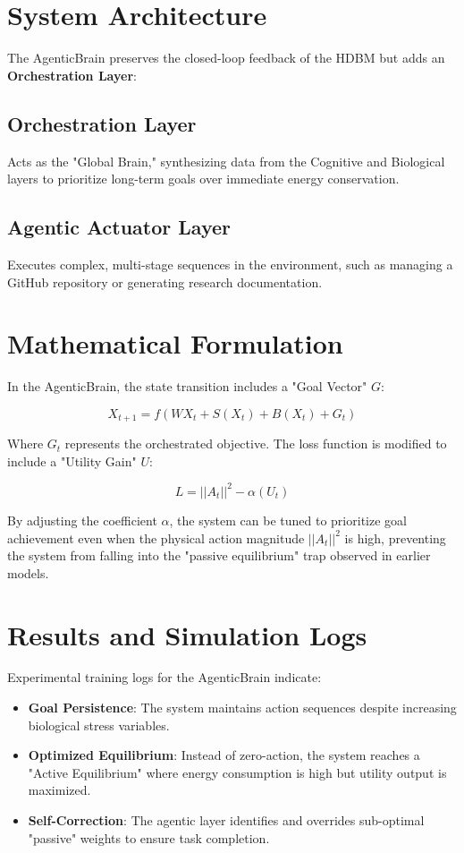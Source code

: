 \documentclass[12pt]{article}
\begin{document}
\section{System Architecture}

The AgenticBrain preserves the closed-loop feedback of the HDBM but adds an \textbf{Orchestration Layer}:

\subsection{Orchestration Layer}
Acts as the "Global Brain," synthesizing data from the Cognitive and Biological layers to prioritize long-term goals over immediate energy conservation.

\subsection{Agentic Actuator Layer}
Executes complex, multi-stage sequences in the environment, such as managing a GitHub repository or generating research documentation.

\section{Mathematical Formulation}

In the AgenticBrain, the state transition includes a "Goal Vector" $G$:

\[
X_{t+1} = f(WX_t + S(X_t) + B(X_t) + G_t)
\]

Where $G_t$ represents the orchestrated objective. The loss function is modified to include a "Utility Gain" $U$:

\[
L = ||A_t||^2 - \alpha(U_t)
\]

By adjusting the coefficient $\alpha$, the system can be tuned to prioritize goal achievement even when the physical action magnitude $||A_t||^2$ is high, preventing the system from falling into the "passive equilibrium" trap observed in earlier models.

\section{Results and Simulation Logs}

Experimental training logs for the AgenticBrain indicate:
\begin{itemize}
\item \textbf{Goal Persistence}: The system maintains action sequences despite increasing biological stress variables.
\item \textbf{Optimized Equilibrium}: Instead of zero-action, the system reaches a "Active Equilibrium" where energy consumption is high but utility output is maximized.
\item \textbf{Self-Correction}: The agentic layer identifies and overrides sub-optimal "passive" weights to ensure task completion.
\end{itemize}
\end{document}
